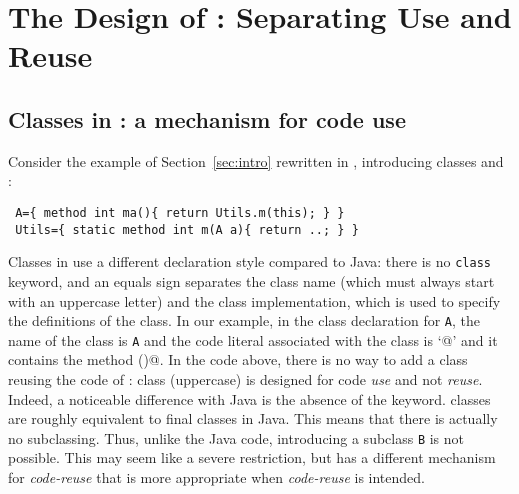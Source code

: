 \saveSpace\saveSpace\saveSpace\saveSpace\saveSpace
\section{The Design of \name: Separating Use and Reuse}\label{sec:separate}

\saveSpace\saveSpace
\subsection{Classes in \name: a mechanism for code use}
\saveSpace\saveSpace\saveSpace
Consider the example of Section~\ref{sec:intro} rewritten in \name, introducing classes \Q@Utils@ and \Q@A@:
\saveSpace\saveSpace
\begin{lstlisting}
 A={ method int ma(){ return Utils.m(this); } }
 Utils={ static method int m(A a){ return ..; } }
\end{lstlisting} 
\saveSpace\saveSpace
\noindent Classes in \name use a different declaration style compared
to Java: there is no \lstinline{class} keyword, and an equals sign separates the class name (which must always start with
an uppercase letter) and the class implementation, which is used to specify the
definitions of the class. In our example, in the class declaration
for \lstinline{A}, the name of the class is \lstinline{A} and the code 
literal associated with the class is `@' and it contains the method \Q@ma()@.
In the \name code above, there is no way to add a class 
\Q@B@ reusing the code of \Q@A@: class \Q@A@ (uppercase) is designed for code \emph{use} and not \emph{reuse}.
Indeed, a noticeable difference with Java is the
absence of the \Q@extends@ keyword.
\name classes are roughly equivalent to final classes in Java. This means that there is actually no subclassing.
Thus, unlike the Java code, introducing a subclass
\lstinline{B} is not possible. This may seem like a severe restriction, but
\name has a different mechanism for \emph{code-reuse} that 
is more appropriate when \emph{code-reuse} is intended. 

